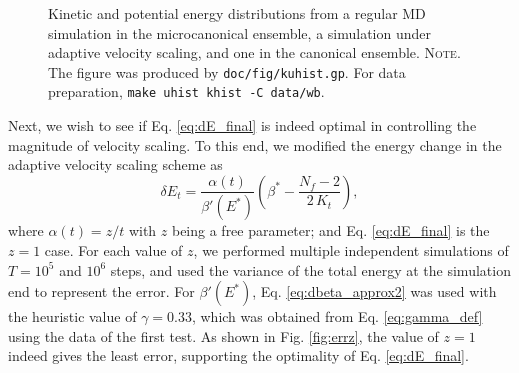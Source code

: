 \documentclass[reprint]{revtex4-1}
\newcommand{\note}[1]{{\color{DarkGreen}\footnotesize \textsc{Note.} #1}}
\begin{document}
\begin{figure}[h]
\begin{center}
  \caption{
    \label{fig:kuhist}
    Kinetic and potential energy distributions
    from a regular MD simulation in the microcanonical ensemble,
    a simulation under adaptive velocity scaling,
    and one in the canonical ensemble.
    \note{The figure was produced by \texttt{doc/fig/kuhist.gp}.
      For data preparation, \texttt{make uhist khist -C data/wb}.
    }%
  }
\end{center}
\end{figure}


Next, we wish to see if Eq. \eqref{eq:dE_final}
is indeed optimal in controlling the magnitude of velocity scaling.
%
To this end, we modified the energy change in
the adaptive velocity scaling scheme as
%
\begin{equation}
  \delta E_t
  =
  \frac{ \alpha(t) } { \beta'(E^*) }
  \left(
   \beta^* -
   \frac{ N_f - 2 }
   { 2 \, K_t }
  \right)
  ,
  \label{eq:dE_mod}
\end{equation}
%
where $\alpha(t) = z/t$ with $z$ being a free parameter;
and Eq. \eqref{eq:dE_final} is the $z = 1$ case.
%
For each value of $z$,
we performed multiple independent simulations of
$T = 10^5$ and $10^6$ steps,
and used the variance of the total energy at the simulation end
to represent the error.
%
For $\beta'(E^*)$,
Eq. \eqref{eq:dbeta_approx2} was used with the heuristic value of
$\gamma = 0.33$,
which was obtained from Eq. \eqref{eq:gamma_def}
using the data of the first test.
%
As shown in Fig. \ref{fig:errz},
the value of $z = 1$
indeed gives the least error,
supporting the optimality of Eq. \eqref{eq:dE_final}.
\end{document}
